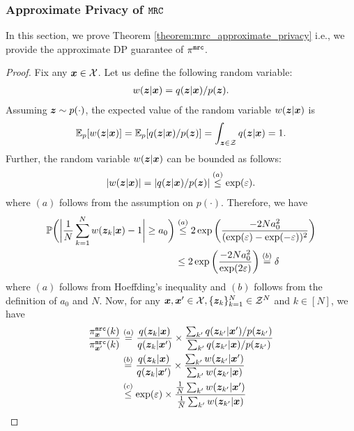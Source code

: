 \subsubsection{Approximate Privacy of \texorpdfstring{$\texttt{MRC}$}{MRC}}\label{appendix:approx_privacy_mrc}
In this section, we prove Theorem \ref{theorem:mrc_approximate_privacy} i.e., we provide the approximate DP guarantee of $\pi^{\texttt{mrc}}$.
\mrcapproxprivacy*
\begin{proof}
Fix any ${\boldsymbol{x}} \in \mathcal{X}$. Let us define the following random variable:
\begin{align}
w({\boldsymbol{z}}|{\boldsymbol{x}}) = q({\boldsymbol{z}}|{\boldsymbol{x}}) / p({\boldsymbol{z}}). \label{eq:importance_weights}
\end{align}
Assuming ${\boldsymbol{z}} \sim p(\cdot)$, the expected value of the random variable $w({\boldsymbol{z}}|{\boldsymbol{x}})$ is 
\begin{align}
\mathbb{E}_{p}[w({\boldsymbol{z}}|{\boldsymbol{x}})] = \mathbb{E}_{p}[q({\boldsymbol{z}}|{\boldsymbol{x}}) / p({\boldsymbol{z}})] = \int_{{\boldsymbol{z}} \in \mathcal{Z}} q({\boldsymbol{z}}|{\boldsymbol{x}}) = 1.
\end{align}
Further, the random variable $w({\boldsymbol{z}}|{\boldsymbol{x}})$ can be bounded as follows:
\begin{align}
| w({\boldsymbol{z}}|{\boldsymbol{x}}) | = | q({\boldsymbol{z}}|{\boldsymbol{x}}) / p({\boldsymbol{z}}) | \stackrel{(a)}{\leq} \exp(\varepsilon).
\end{align}
where $(a)$ follows from the assumption on $p(\cdot)$. Therefore, we have
\begin{align}
    \mathbb{P}\bigg( \bigg| \frac{1}{N}\sum_{k=1}^{N} w({\boldsymbol{z}}_k|{\boldsymbol{x}}) - 1 \bigg| \geq a_0 \bigg) & \stackrel{(a)}{\leq}  2 \exp\bigg(\frac{-2Na_0^2}{(\exp(\varepsilon)-\exp(-\varepsilon))^2}\bigg) \\
    & \leq 2 \exp\bigg(\frac{-2Na_0^2}{\exp(2\varepsilon)}\bigg) \stackrel{(b)}{=} \delta \label{eq:hoeffdings_inequality}
\end{align}
where $(a)$ follows from Hoeffding's inequality and $(b)$ follows from the definition of $a_0$ and $N$. Now, for any ${\boldsymbol{x}}, {\boldsymbol{x}}' \in \mathcal{X}, \{{\boldsymbol{z}}_k\}_{k=1}^{N} \in \mathcal{Z}^N$ and $k \in [N]$, we have
\begin{align}
    \frac{\piMRC_{\svbx}(k)}{\piMRC_{\svbx'}(k)} & 
    \stackrel{(a)}{=} \frac{q(\svbz_k | \svbx)}{q(\svbz_k | \svbx')} \times \frac{\sum_{k'} q(\svbz_{k'} | \svbx')/p(\svbz_{k'})}{\sum_{k'} q(\svbz_{k'} | \svbx)/p(\svbz_{k'})} \\
    & \stackrel{(b)}{=} \frac{q(\svbz_k | \svbx)}{q(\svbz_k | \svbx')} \times \frac{\sum_{k'} w(\svbz_{k'}|\svbx')}{\sum_{k'} w(\svbz_{k'}|\svbx)} \\
    & \stackrel{(c)}{\leq} \exp(\varepsilon) \times \frac{\frac{1}{N}\sum_{k'} w(\svbz_{k'}|\svbx')}{\frac{1}{N}\sum_{k'} w(\svbz_{k'}|\svbx)} \label{eq:approx_dp_intermediate}

\end{align}
\end{proof}
